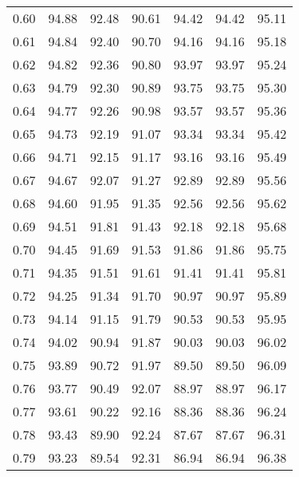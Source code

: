 \begin{tabular}{|c|c|c|c|c|c|c|}
      0.60 &     94.88 &     92.48 &      90.61 &   94.42 &      94.42 &         95.11 \\
      0.61 &     94.84 &     92.40 &      90.70 &   94.16 &      94.16 &         95.18 \\
      0.62 &     94.82 &     92.36 &      90.80 &   93.97 &      93.97 &         95.24 \\
      0.63 &     94.79 &     92.30 &      90.89 &   93.75 &      93.75 &         95.30 \\
      0.64 &     94.77 &     92.26 &      90.98 &   93.57 &      93.57 &         95.36 \\
      0.65 &     94.73 &     92.19 &      91.07 &   93.34 &      93.34 &         95.42 \\
      0.66 &     94.71 &     92.15 &      91.17 &   93.16 &      93.16 &         95.49 \\
      0.67 &     94.67 &     92.07 &      91.27 &   92.89 &      92.89 &         95.56 \\
      0.68 &     94.60 &     91.95 &      91.35 &   92.56 &      92.56 &         95.62 \\
      0.69 &     94.51 &     91.81 &      91.43 &   92.18 &      92.18 &         95.68 \\
      0.70 &     94.45 &     91.69 &      91.53 &   91.86 &      91.86 &         95.75 \\
      0.71 &     94.35 &     91.51 &      91.61 &   91.41 &      91.41 &         95.81 \\
      0.72 &     94.25 &     91.34 &      91.70 &   90.97 &      90.97 &         95.89 \\
      0.73 &     94.14 &     91.15 &      91.79 &   90.53 &      90.53 &         95.95 \\
      0.74 &     94.02 &     90.94 &      91.87 &   90.03 &      90.03 &         96.02 \\
      0.75 &     93.89 &     90.72 &      91.97 &   89.50 &      89.50 &         96.09 \\
      0.76 &     93.77 &     90.49 &      92.07 &   88.97 &      88.97 &         96.17 \\
      0.77 &     93.61 &     90.22 &      92.16 &   88.36 &      88.36 &         96.24 \\
      0.78 &     93.43 &     89.90 &      92.24 &   87.67 &      87.67 &         96.31 \\
      0.79 &     93.23 &     89.54 &      92.31 &   86.94 &      86.94 &         96.38 \\

\end{tabular}
